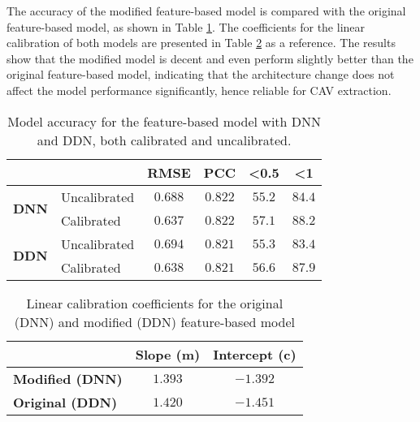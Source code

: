 The accuracy of the modified feature-based model is compared with the original feature-based model, as shown in Table \ref{tab:model_accuracy_dnn_like}. The coefficients for the linear calibration of both models are presented in Table \ref{tab:linear_regression_coefficients_dnn_like} as a reference. The results show that the modified model is decent and even perform slightly better than the original feature-based model, indicating that the architecture change does not affect the model performance significantly, hence reliable for CAV extraction.

\begin{table}[H]
    \centering
    \begin{tabular}{|l|l|c|c|c|c|}
        \hline
        \multicolumn{2}{|l|}{\textbf{}} & \textbf{RMSE} & \textbf{PCC} & \textbf{\textless 0.5} & \textbf{\textless 1}          \\ \hline
        \multirow{2}{*}{\textbf{DNN}}
                                        & Uncalibrated  & $0.688$      & $0.822$                & $55.2$               & $84.4$ \\ \cline{2-6}
                                        & Calibrated    & $0.637$      & $0.822$                & $57.1$               & $88.2$ \\ \hline
        \multirow{2}{*}{\textbf{DDN}}
                                        & Uncalibrated  & $0.694$      & $0.821$                & $55.3$               & $83.4$ \\ \cline{2-6}
                                        & Calibrated    & $0.638$      & $0.821$                & $56.6$               & $87.9$ \\ \hline
    \end{tabular}
    \caption{Model accuracy for the feature-based model with DNN and DDN, both calibrated and uncalibrated.}
    \label{tab:model_accuracy_dnn_like}
\end{table}


\begin{table}[H]
    \centering
    \begin{tabular}{|l|c|c|}
        \hline
        \textbf{}               & \textbf{Slope (m)} & \textbf{Intercept (c)} \\ \hline
        \textbf{Modified (DNN)} & $1.393$            & $-1.392$               \\ \hline
        \textbf{Original (DDN)} & $1.420$            & $-1.451$               \\ \hline
    \end{tabular}
    \caption{Linear calibration coefficients for the original (DNN) and modified (DDN) feature-based model}
    \label{tab:linear_regression_coefficients_dnn_like}
\end{table}

